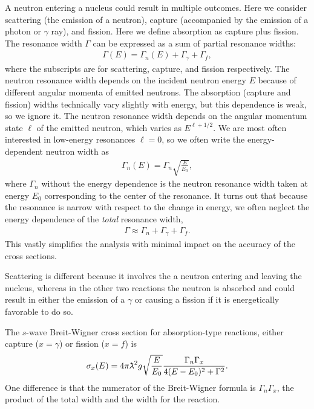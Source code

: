 A neutron entering a nucleus could result in multiple outcomes. Here we consider scattering (the emission of a neutron), capture (accompanied by the emission of a photon or $\gamma$ ray), and fission. Here we define absorption as capture plus fission. The resonance width $\Gamma$ can be expressed as a sum of partial resonance widths:
\begin{align}
  \Gamma(E) = \Gamma_n(E) + \Gamma_\gamma + \Gamma_f ,
\end{align}
where the subscripts are for scattering, capture, and fission respectively. The neutron resonance width depends on the incident neutron energy $E$ because of different angular momenta of emitted neutrons. The absorption (capture and fission) widths technically vary slightly with energy, but this dependence is weak, so we ignore it. The neutron resonance width depends on the angular momentum state $\ell$ of the emitted neutron, which varies as $E^{\ell + 1/2}$. We are most often interested in low-energy resonances $\ell = 0$, so we often write the energy-dependent neutron width as
\begin{align}
  \Gamma_n(E) = \Gamma_n \sqrt{ \frac{E}{E_0} },
\end{align}
where $\Gamma_n$ without the energy dependence is the neutron resonance width taken at energy $E_0$ corresponding to the center of the resonance. It turns out that because the resonance is narrow with respect to the change in energy, we often neglect the energy dependence of the \emph{total} resonance width,
\begin{align}
  \Gamma \approx \Gamma_n + \Gamma_\gamma + \Gamma_f .
\end{align}
This vastly simplifies the analysis with minimal impact on the accuracy of the cross sections.

Scattering is different because it involves the a neutron entering and leaving the nucleus, whereas in the other two reactions the neutron is absorbed and could result in either the emission of a $\gamma$ or causing a fission if it is energetically favorable to do so. 

The $s$-wave Breit-Wigner cross section for absorption-type reactions, either capture ($x = \gamma$) or fission ($x = f$) is
\begin{align}
  \sigma_x(E) = 4 \pi \lambdabar^2 g  \sqrt{ \frac{E}{E_0} }  \frac{ \Gamma_n \Gamma_x }{ 4 ( E - E_0 )^2 + \Gamma^2 } .
\end{align}
One difference is that the numerator of the Breit-Wigner formula is $\Gamma_n \Gamma_x$, the product of the total width and the width for the reaction. 

